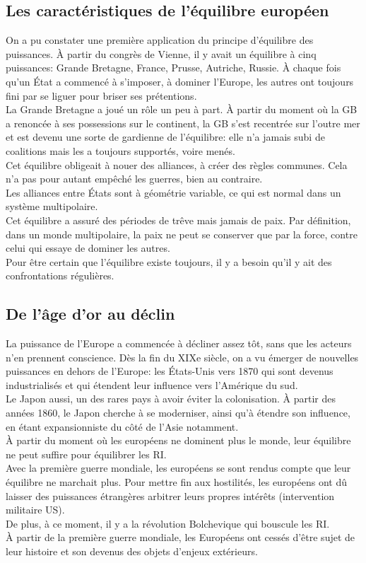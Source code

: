 \documentclass[10pt, a4paper, openany]{book}
\begin{document}
\subsection{Les caractéristiques de l'équilibre européen}

On a pu constater une première application du principe d'équilibre des puissances. À partir du congrès de Vienne, il y avait un équilibre à cinq puissances: Grande Bretagne, France, Prusse, Autriche, Russie. À chaque fois qu'un État a commencé à s'imposer, à dominer l'Europe, les autres ont toujours fini par se liguer pour briser ses prétentions. \\
La Grande Bretagne a joué un rôle un peu à part. À partir du moment où la GB a renoncée à ses possessions sur le continent, la GB s'est recentrée sur l'outre mer et est devenu une sorte de gardienne de l'équilibre: elle n'a jamais subi de coalitions mais les a toujours supportés, voire menés. \\
Cet équilibre obligeait à nouer des alliances, à créer des règles communes. Cela n'a pas pour autant empêché les guerres, bien au contraire. \\
Les alliances entre États sont à géométrie variable, ce qui est normal dans un système multipolaire. \\
Cet équilibre a assuré des périodes de trêve mais jamais de paix. Par définition, dans un monde multipolaire, la paix ne peut se conserver que par la force, contre celui qui essaye de dominer les autres. \\
Pour être certain que l'équilibre existe toujours, il y a besoin qu'il y ait des confrontations régulières. 

\subsection{De l'âge d'or au déclin}

La puissance de l'Europe a commencée à décliner assez tôt, sans que les acteurs n'en prennent conscience. Dès la fin du XIXe siècle, on a vu émerger de nouvelles puissances en dehors de l'Europe: les États-Unis vers 1870 qui sont devenus industrialisés et qui étendent leur influence vers l'Amérique du sud. \\
Le Japon aussi, un des rares pays à avoir éviter la colonisation. À partir des années 1860, le Japon cherche à se moderniser, ainsi qu'à étendre son influence, en étant expansionniste du côté de l'Asie notamment. \\
À partir du moment où les européens ne dominent plus le monde, leur équilibre ne peut suffire pour équilibrer les RI. \\
Avec la première guerre mondiale, les européens se sont rendus compte que leur équilibre ne marchait plus. Pour mettre fin aux hostilités, les européens ont dû laisser des puissances étrangères arbitrer leurs propres intérêts (intervention militaire US). \\
De plus, à ce moment, il y a la révolution Bolchevique qui bouscule les RI. \\
À partir de la première guerre mondiale, les Européens ont cessés d'être sujet de leur histoire et son devenus des objets d'enjeux extérieurs. 
\end{document}
